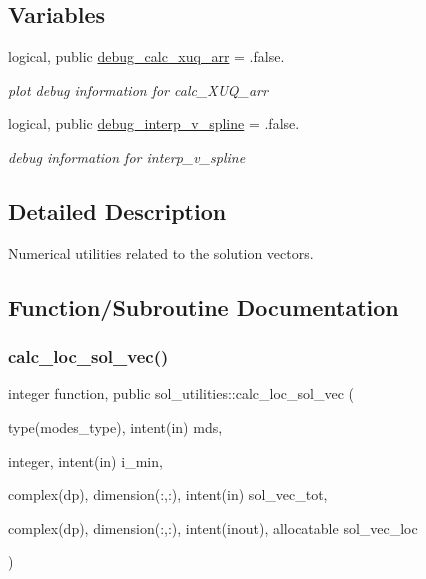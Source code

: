 \subsection*{Variables}
\begin{DoxyCompactItemize}
\item 
logical, public \hyperlink{namespacesol__utilities_a4779ff845b4ddc046892bf4eb4490dd2}{debug\+\_\+calc\+\_\+xuq\+\_\+arr} = .false.
\begin{DoxyCompactList}\small\item\em plot debug information for calc\+\_\+\+X\+U\+Q\+\_\+arr \end{DoxyCompactList}\item 
logical, public \hyperlink{namespacesol__utilities_aa36c52e73c02a783074c7c0e5076c903}{debug\+\_\+interp\+\_\+v\+\_\+spline} = .false.
\begin{DoxyCompactList}\small\item\em debug information for interp\+\_\+v\+\_\+spline \end{DoxyCompactList}\end{DoxyCompactItemize}


\subsection{Detailed Description}
Numerical utilities related to the solution vectors. 

\subsection{Function/\+Subroutine Documentation}
\mbox{\label{namespacesol__utilities_a677373f47ee68ad02e9cef5b409bdc26}} 
\subsubsection{\texorpdfstring{calc\+\_\+loc\+\_\+sol\+\_\+vec()}{calc\_loc\_sol\_vec()}}
{\footnotesize\ttfamily integer function, public sol\+\_\+utilities\+::calc\+\_\+loc\+\_\+sol\+\_\+vec (\begin{DoxyParamCaption}\item[{type(modes\+\_\+type), intent(in)}]{mds,  }\item[{integer, intent(in)}]{i\+\_\+min,  }\item[{complex(dp), dimension(\+:,\+:), intent(in)}]{sol\+\_\+vec\+\_\+tot,  }\item[{complex(dp), dimension(\+:,\+:), intent(inout), allocatable}]{sol\+\_\+vec\+\_\+loc }\end{DoxyParamCaption})}



